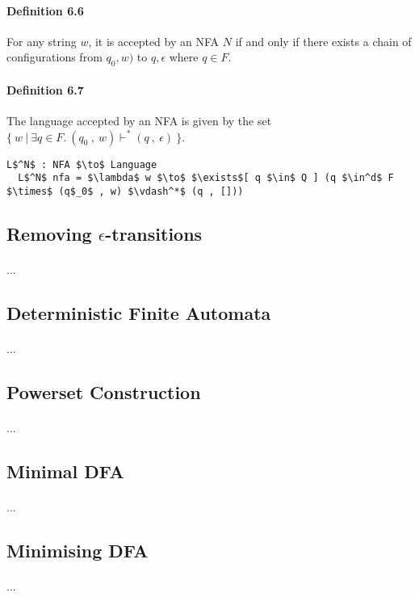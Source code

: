 \paragraph{Definition 6.6} For any string \(w\), it is accepted by an NFA \(N\)
if and only if there exists a chain of configurations from \(q_0 ,
w)\) to \(q , \epsilon\) where \(q \in F\). 

\paragraph{Definition 6.7} The language accepted by an
NFA is given by the set \(\{\ w\ |\ \exists q\in F.\ (q_0\ ,\
w) \vdash^* (q\ ,\ \epsilon)\ \}\). 

\begin{lstlisting}[mathescape=true]
  L$^N$ : NFA $\to$ Language
  L$^N$ nfa = $\lambda$ w $\to$ $\exists$[ q $\in$ Q ] (q $\in^d$ F $\times$ (q$_0$ , w) $\vdash^*$ (q , []))
\end{lstlisting} 

\subsection{Removing \(\epsilon\)-transitions}
\paragraph{} ...

\subsection{Deterministic Finite Automata}
\paragraph{} ...

\subsection{Powerset Construction}
\paragraph{} ...

\subsection{Minimal DFA}
\paragraph{} ...

\subsection{Minimising DFA}
\paragraph{} ...
